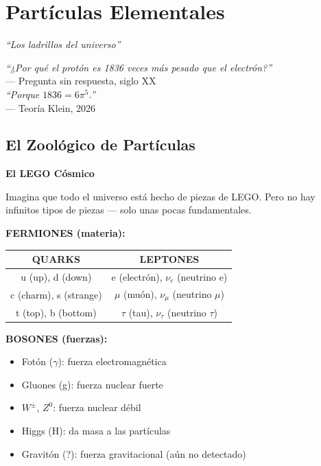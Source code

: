 \chapter{Partículas Elementales}
\label{cap:particulas}

\begin{center}
\textit{``Los ladrillos del universo''}
\end{center}

\vspace{0.5cm}

\begin{tcolorbox}[colback=white, colframe=kleinblue, boxrule=2pt]
\centering
\textit{``¿Por qué el protón es 1836 veces más pesado que el electrón?''}\\
--- Pregunta sin respuesta, siglo XX\\[0.3cm]
\textit{``Porque $1836 = 6\pi^5$.''}\\
--- Teoría Klein, 2026
\end{tcolorbox}


\section{El Zoológico de Partículas}

\begin{analogiabox}
\textbf{El LEGO Cósmico}

Imagina que todo el universo está hecho de piezas de LEGO.
Pero no hay infinitos tipos de piezas --- solo unas pocas fundamentales.

\textbf{FERMIONES (materia):}

\begin{center}
\begin{tabular}{|c|c|}
\hline
\textbf{QUARKS} & \textbf{LEPTONES} \\
\hline
u (up), d (down) & e (electrón), $\nu_e$ (neutrino e) \\
c (charm), s (strange) & $\mu$ (muón), $\nu_\mu$ (neutrino $\mu$) \\
t (top), b (bottom) & $\tau$ (tau), $\nu_\tau$ (neutrino $\tau$) \\
\hline
\end{tabular}
\end{center}

\textbf{BOSONES (fuerzas):}
\begin{itemize}
    \item Fotón ($\gamma$): fuerza electromagnética
    \item Gluones (g): fuerza nuclear fuerte
    \item $W^\pm$, $Z^0$: fuerza nuclear débil
    \item Higgs (H): da masa a las partículas
    \item Gravitón (?): fuerza gravitacional (aún no detectado)
\end{itemize}
\end{analogiabox}


